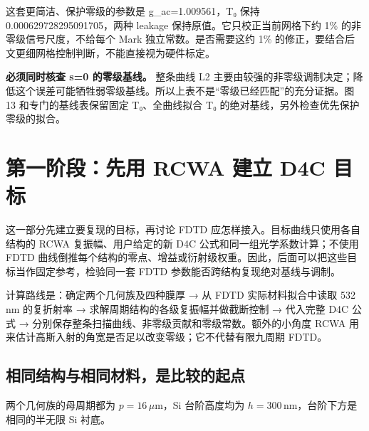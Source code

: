 \documentclass[
  chinese,
  UTF8,
  a4paper,
  11pt]{ctexart}
\begin{document}
这套更简洁、保护零级的参数是 g\_ac=1.009561，T₀ 保持
0.000629728295091705，两种 leakage 保持原值。它只校正当前网格下约 1\%
的非零级信号尺度，不给每个 Mark 独立常数。是否需要这约 1\%
的修正，要结合后文更细网格控制判断，不能直接视为硬件标定。

\textbf{必须同时核查 s=0 的零级基线。} 整条曲线 L2
主要由较强的非零级调制决定；降低这个误差可能牺牲弱零级基线。所以上表不是``零级已经匹配''的充分证据。图
13 和专门的基线表保留固定 T₀、全曲线拟合 T₀
的绝对基线，另外检查优先保护零级的拟合。

\section{第一阶段：先用 RCWA 建立 D4C
目标}\label{ux7b2cux4e00ux9636ux6bb5ux5148ux7528-rcwa-ux5efaux7acb-d4c-ux76eeux6807}

这一部分先建立要复现的目标，再讨论 FDTD
应怎样接入。目标曲线只使用各自结构的 RCWA 复振幅、用户给定的新 D4C
公式和同一组光学系数计算；不使用 FDTD
曲线倒推每个结构的零点、增益或衍射级权重。因此，后面可以把这些目标当作固定参考，检验同一套
FDTD 参数能否跨结构复现绝对基线与调制。

计算路线是：确定两个几何族及四种膜厚 → 从 FDTD 实际材料拟合中读取 532 nm
的复折射率 → 求解周期结构的各级复振幅并做截断控制 → 代入完整 D4C 公式 →
分别保存整条扫描曲线、非零级贡献和零级常数。额外的小角度 RCWA
用来估计高斯入射的角宽是否足以改变零级；它不代替有限九周期 FDTD。

\subsection{相同结构与相同材料，是比较的起点}\label{ux76f8ux540cux7ed3ux6784ux4e0eux76f8ux540cux6750ux6599ux662fux6bd4ux8f83ux7684ux8d77ux70b9}

两个几何族的母周期都为 \(p=16\,\mu\mathrm m\)，Si 台阶高度均为
\(h=300\,\mathrm{nm}\)，台阶下方是相同的半无限 Si 衬底。
\end{document}
